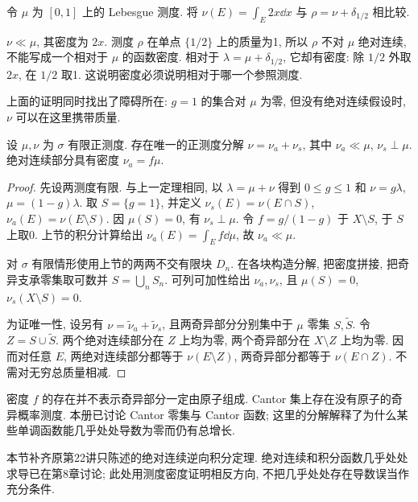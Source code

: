 \begin{example}
令 $\mu$ 为 $[0,1]$ 上的 Lebesgue 测度. 将 $\nu(E)=\int_E2x\dd x$ 与 $\rho=\nu+\delta_{1/2}$ 相比较.
\end{example}
\begin{solution}
$\nu\ll\mu$, 其密度为 $2x$. 测度 $\rho$ 在单点 $\{1/2\}$ 上的质量为1, 所以 $\rho$ 不对 $\mu$ 绝对连续, 不能写成一个相对于 $\mu$ 的函数密度. 相对于 $\lambda=\mu+\delta_{1/2}$, 它却有密度: 除 $1/2$ 外取 $2x$, 在 $1/2$ 取1. 这说明密度必须说明相对于哪一个参照测度.
\end{solution}

上面的证明同时找出了障碍所在: $g=1$ 的集合对 $\mu$ 为零, 但没有绝对连续假设时, $\nu$ 可以在这里携带质量.

\begin{theorem}[Lebesgue 分解]\label{ra:c9:decomposition}
设 $\mu,\nu$ 为 $\sigma$ 有限正测度. 存在唯一的正测度分解 $\nu=\nu_a+\nu_s$, 其中 $\nu_a\ll\mu$, $\nu_s\perp\mu$. 绝对连续部分具有密度 $\nu_a=f\mu$.
\end{theorem}
\begin{proof}
先设两测度有限. 与上一定理相同, 以 $\lambda=\mu+\nu$ 得到 $0\le g\le1$ 和 $\nu=g\lambda$, $\mu=(1-g)\lambda$. 取 $S=\{g=1\}$, 并定义 $\nu_s(E)=\nu(E\cap S)$, $\nu_a(E)=\nu(E\setminus S)$. 因 $\mu(S)=0$, 有 $\nu_s\perp\mu$. 令 $f=g/(1-g)$ 于 $X\setminus S$, 于 $S$ 上取0. 上节的积分计算给出 $\nu_a(E)=\int_Ef\dd\mu$, 故 $\nu_a\ll\mu$.

对 $\sigma$ 有限情形使用上节的两两不交有限块 $D_n$. 在各块构造分解, 把密度拼接, 把奇异支承零集取可数并 $S=\bigcup_nS_n$. 可列可加性给出 $\nu_a,\nu_s$, 且 $\mu(S)=0$, $\nu_s(X\setminus S)=0$.

为证唯一性, 设另有 $\nu=\widetilde\nu_a+\widetilde\nu_s$, 且两奇异部分分别集中于 $\mu$ 零集 $S,\widetilde S$. 令 $Z=S\cup\widetilde S$. 两个绝对连续部分在 $Z$ 上均为零, 两个奇异部分在 $X\setminus Z$ 上均为零. 因而对任意 $E$, 两绝对连续部分都等于 $\nu(E\setminus Z)$, 两奇异部分都等于 $\nu(E\cap Z)$. 不需对无穷总质量相减.
\end{proof}

\begin{remark}
密度 $f$ 的存在并不表示奇异部分一定由原子组成. Cantor 集上存在没有原子的奇异概率测度. 本册已讨论 Cantor 零集与 Cantor 函数; 这里的分解解释了为什么某些单调函数能几乎处处导数为零而仍有总增长.
\end{remark}

\noindent 本节补齐原第22讲只陈述的绝对连续逆向积分定理. 绝对连续和积分函数几乎处处求导已在第8章讨论; 此处用测度密度证明相反方向, 不把几乎处处存在导数误当作充分条件.

